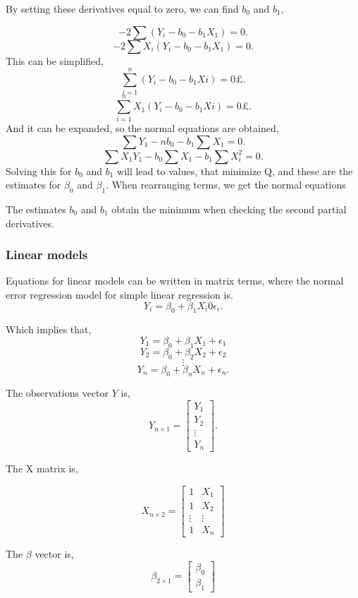 \noindent By setting these derivatives equal to zero, we can find $b_0$ and $b_1$, 

$$-2 \sum (Y_i - b_0 - b_1 X_1)=0 .$$
$$-2\sum X_i(Y_i - b_0 - b_1 X_1)=0 .$$
This can be simplified, 
$$\sum_{i=1}^{n} (Y_i - b_0 - b_1 Xi)=0£ .$$
$$\sum_{i=1}^{n} X_1(Y_i - b_0 - b_1 Xi)=0£ .$$
And it can be expanded, so the normal equations are obtained, 
$$\sum Y_1 - n b_0 - b_1 \sum X_1 =0 .$$
$$\sum X_1 Y_1  - b_0 \sum X_1 - b_1 \sum X_i^2 =0 .$$
Solving this for $b_0$ and $b_1$ will lead to values, that minimize Q, and these are the estimates for $\beta_0$ and $\beta_1$. 
When rearranging terms, we get the normal equations %

\noindent The estimates $b_0$ and $b_1$ obtain the minimum when checking the second partial derivatives. \newline


\subsubsection{Linear models}

Equations for linear models can be written in matrix terms, where the normal error regression model for simple linear regression is.
$$Y_i = \beta_0 + \beta_1 X_i 0 \epsilon_i .$$ 


\noindent Which implies that,
$$Y_1 = \beta_0 + \beta_1 X_1 + \epsilon_1$$
$$Y_2 = \beta_0 + \beta_2 X_2 + \epsilon_2$$
$$\vdots$$
$$Y_n = \beta_0 + \beta_n X_n + \epsilon_n .$$

\noindent The observations vector $Y$ is,
$$ Y_{n \times 1} =
\left[
\begin{array}{c}
	Y_1 \\ 
	Y_2 \\ 
	\vdots \\
	Y_n 
\end{array}
\right].
$$	

\noindent The X matrix is, 

$$X_{n \times 2}=
\left[
\begin{array}{cc}
	1 & X_1 \\ 
	1 & X_2 \\ 
	\vdots & \vdots \\
	1 & X_n
\end{array}
\right]
$$


\noindent The $\beta$ vector is, 
$$ \beta_{2 \times 1} =
\left[
\begin{array}{c}
	\beta_0 \\ 
	\beta_1 
\end{array}
\right]
$$

